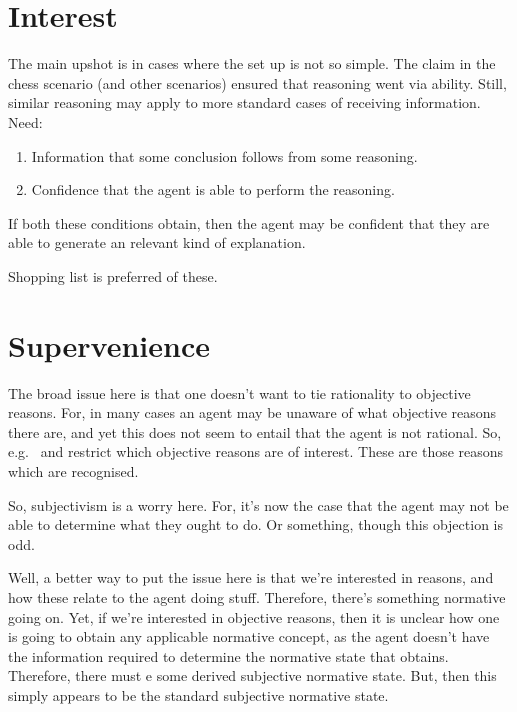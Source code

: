 \documentclass[10pt]{article}
\begin{document}
\section{Interest}
\label{sec:interest}

The main upshot is in cases where the set up is not so simple.
The claim in the chess scenario (and other scenarios) ensured that reasoning went via ability.
Still, similar reasoning may apply to more standard cases of receiving information.
Need:
\begin{enumerate}
\item Information that some conclusion follows from some reasoning.
\item Confidence that the agent is able to perform the reasoning.
\end{enumerate}
If both these conditions obtain, then the agent may be confident that they are able to generate an {\color{red} relevant kind of} explanation.

Shopping list is preferred of these.



\section{Supervenience}
\label{sec:supervenience}

\begin{note}
  The broad issue here is that one doesn't want to tie rationality to objective reasons.
  For, in many cases an agent may be unaware of what objective reasons there are, and yet this does not seem to entail that the agent is not rational.
  So, e.g.\ \citeauthor{Lord:2018aa} and \citeauthor{Kiesewetter:2017aa} restrict which objective reasons are of interest.
  These are those reasons which are recognised.

  So, subjectivism is a worry here.
  For, it's now the case that the agent may not be able to determine what they ought to do.
  Or something, though this objection is odd.

  Well, a better way to put the issue here is that we're interested in reasons, and how these relate to the agent doing stuff.
  Therefore, there's something normative going on.
  Yet, if we're interested in objective reasons, then it is unclear how one is going to obtain any applicable normative concept, as the agent doesn't have the information required to determine the normative state that obtains.
  Therefore, there must e some derived subjective normative state.
  But, then this simply appears to be the standard subjective normative state.
\end{note}
\end{document}
